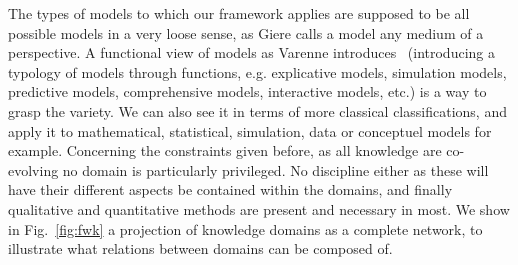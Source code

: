 \documentclass[runningheads,a4paper]{llncs2e/llncs}
\begin{document}

The types of models to which our framework applies are supposed to be all possible models in a very loose sense, as Giere calls a model any medium of a perspective. A functional view of models as Varenne introduces~\cite{varenne2010simulations} (introducing a typology of models through functions, e.g. explicative models, simulation models, predictive models, comprehensive models, interactive models, etc.) is a way to grasp the variety. We can also see it in terms of more classical classifications, and apply it to mathematical, statistical, simulation, data or conceptuel models for example. Concerning the constraints given before, as all knowledge are co-evolving no domain is particularly privileged. No discipline either as these will have their different aspects be contained within the domains, and finally qualitative and quantitative methods are present and necessary in most. We show in Fig.~\ref{fig:fwk} a projection of knowledge domains as a complete network, to illustrate what relations between domains can be composed of.
\end{document}
